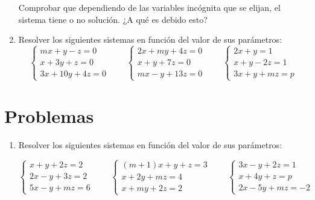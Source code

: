 \documentclass[a4paper]{article}
\begin{document}
\begin{enumerate}[leftmargin=*]
Comprobar que dependiendo de las variables incógnita que se elijan, el sistema tiene o no solución. ¿A qué es debido esto?

\item Resolver los siguientes sistemas en función del valor de sus parámetros:
\[
\left\{
\begin{array}{l}
mx+y-z=0 \\
x+3y+z=0 \\
3x+10y+4z=0  
\end{array}\right.
\qquad
\left\{
\begin{array}{l}
2x+my+4z=0 \\
x+y+7z=0 \\
mx-y+13z=0   
\end{array}\right.
\qquad
\left\{
\begin{array}{l}
2x+y  =1 \\
x+y-2z=1 \\
3x+y+mz=p   
\end{array}\right.
\]

\end{enumerate}


\section*{Problemas}
\begin{enumerate}[leftmargin=*]


\item Resolver los siguientes sistemas en función del valor de sus parámetros:

\[
\left\{
\begin{array}{l}
x+y+2z=2 \\
2x-y+3z=2 \\
5x-y+mz=6  
\end{array}\right.
\qquad
\left\{
\begin{array}{l}
(m+1)x+y+z=3 \\
x+2y+mz=4 \\
x+my+2z=2  
\end{array}\right.
\qquad
\left\{
\begin{array}{l}
3x-y+2z=1 \\
x+4y+z=p \\
2x-5y+mz=-2  
\end{array}\right.
\] 
 
\end{enumerate}
\end{document}
